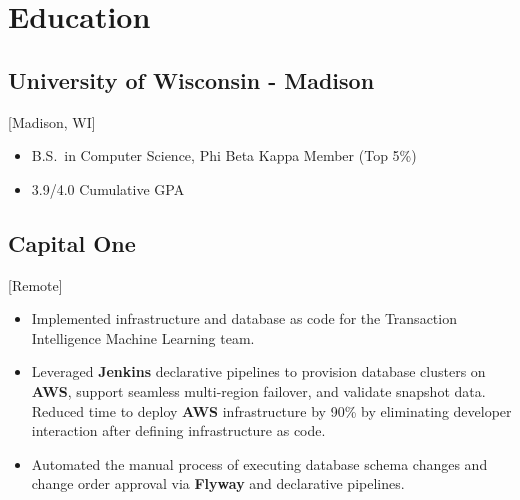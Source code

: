 \documentclass{mycv}
\begin{document}
\maketitle
\section{Education}
\subsection{University of Wisconsin - Madison}[Madison, WI]
\begin{itemize}[label={}]
  \item B.S.\ in Computer Science, Phi Beta Kappa Member (Top 5\%) 
  \item 3.9/4.0 Cumulative GPA
\end{itemize}


\subsection{Capital One}[Remote]
\begin{positions}
\end{positions}
\begin{itemize}
    \item{
     Implemented infrastructure and database as code for the Transaction Intelligence Machine Learning team. 
    }
    \item{
    Leveraged \textbf{Jenkins} declarative pipelines to provision database clusters on \textbf{AWS}, support seamless multi-region failover, and validate snapshot data. Reduced time to deploy \textbf{AWS} infrastructure by 90\% by eliminating developer interaction after defining infrastructure as code.
    }
    \item{
    Automated the manual process of executing database schema changes and change order approval via \textbf{Flyway} and declarative pipelines. 
    }
\end{itemize}
\end{document}
